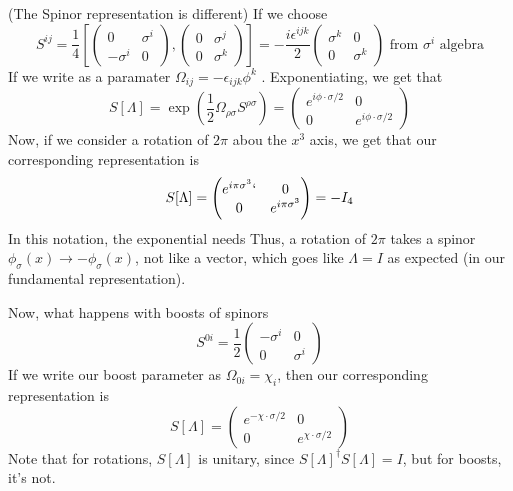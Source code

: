 \begin{example}{(The Spinor representation is different)} 
If we choose 
\[
 S^{ ij } = \frac{1}{4 }\left[  \begin{pmatrix}  
 0 & \sigma ^ i \\ - \sigma ^ i & 0 \end{pmatrix}  , 
 \begin{pmatrix}  0 & \sigma ^ j \\ 0 & \sigma^ k   \end{pmatrix}  \right]  
 =  - \frac{i \epsilon ^{ ijk } }{ 2 } \begin{pmatrix}  \sigma ^ k & 0 
 \\ 0 & \sigma^k \end{pmatrix}  \text{ from } \sigma ^ i \text{ algebra}
\] If we write as a paramater 
$ \Omega_{ ij } =  - \epsilon _{ ijk } \phi ^ k $ . 
Exponentiating, we get that 
\[
	S [ \Lambda ]  = \exp \left(  \frac{1}{2 } \Omega _{ \rho \sigma } 
	S ^{ \rho\sigma } \right)  = \begin{pmatrix}  
	e ^{ i \phi \cdot  \sigma / 2  } & 0 \\ 0 & 
e^{ i \phi \cdot  \sigma / 2 } \end{pmatrix}  
\]   Now, if we consider a rotation of 
$ 2 \pi $ abou the $ x ^ 3 $ axis, we get that 
our corresponding representation is 
\[
	S [ \Lambda ] = \begin{pmatrix}  e ^{ i \pi \sigma ^ 3 }` & 0 \\ 
	0 & e ^{ i \pi \sigma ^ 3 } \end{pmatrix}   = - I _ 4 
\] In this notation, the exponential 
needs Thus, a rotation of $ 2 \pi  $  takes a 
spinor $ \phi _ \sigma ( x ) \to  - \phi _{ \sigma } ( x) $, not like a vector, 
which goes like $ \Lambda = I $ as expected (in our fundamental representation). 

Now, what happens with boosts of spinors 
\[
	S ^{ 0i  }  = \frac{1}{2 } \begin{pmatrix}  - \sigma ^ i & 0 \\ 0 & \sigma ^ i   \end{pmatrix}  
\]  If we write our boost parameter as 
$ \Omega _{ 0i }  = \chi _ i $, then our corresponding representation 
is 
\[
	S [ \Lambda ] = \begin{pmatrix}  e^{  - \chi \cdot \sigma / 2   } & 
	0 \\ 0 & e ^{ \chi \cdot  \sigma / 2 } \end{pmatrix}  
\] Note that for rotations, $ S [ \Lambda ] $ is unitary, since $ S [ \Lambda ] ^ \dagger S [ \Lambda ]  = I $, but for boosts, it's not.
\end{example} 

